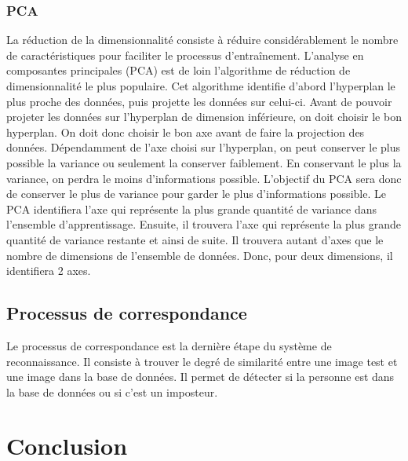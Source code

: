 \documentclass[12pt,twoside,letterpaper]{article}
\begin{document}
\subsubsection{PCA}
La réduction de la dimensionnalité consiste à réduire considérablement le nombre de caractéristiques pour faciliter le processus d’entraînement. L'analyse en composantes principales (PCA) est de loin l'algorithme de réduction de dimensionnalité le plus populaire. Cet algorithme identifie d'abord l'hyperplan le plus proche des données, puis projette les données sur celui-ci. Avant de pouvoir projeter les données sur l’hyperplan de dimension inférieure, on doit choisir le bon hyperplan. On doit donc choisir le bon axe avant de faire la projection des données. Dépendamment de l’axe choisi sur l’hyperplan, on peut conserver le plus possible la variance ou seulement la conserver faiblement. En conservant le plus la variance, on perdra le moins d’informations possible. L’objectif du PCA sera donc de conserver le plus de variance pour garder le plus d’informations possible. Le PCA identifiera l’axe qui représente la plus grande quantité de variance dans l'ensemble d'apprentissage. Ensuite, il trouvera l’axe qui représente la plus grande quantité de variance restante et ainsi de suite. Il trouvera autant d’axes que le nombre de dimensions de l’ensemble de données. Donc, pour deux dimensions, il identifiera 2 axes.
\citep{ref_03}

\subsection{Processus de correspondance}
Le processus de correspondance est la dernière étape du système de reconnaissance. Il consiste à trouver le degré de similarité entre une image test et une image dans la base de données. Il permet de détecter si la personne est dans la base de données ou si c’est un imposteur.

\section{Conclusion}

\newpage

\end{document}
